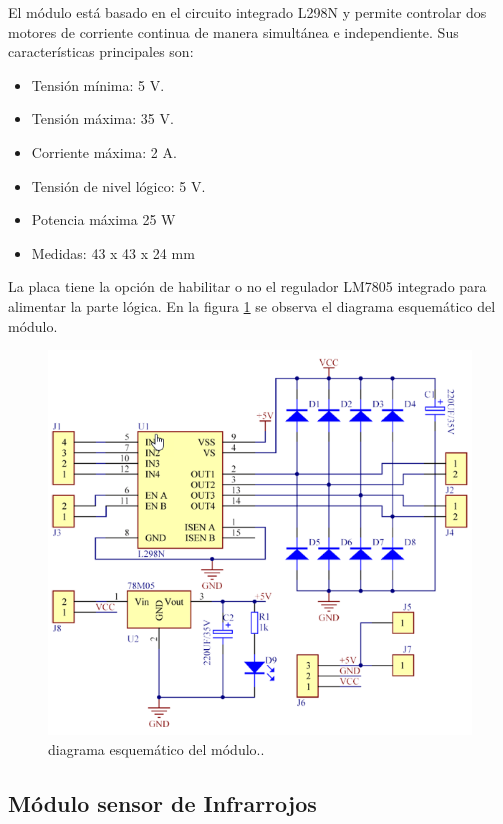 El módulo está basado en el circuito integrado L298N \citep{L298} y permite controlar dos motores de corriente continua de manera simultánea e independiente.  Sus características principales son:

\begin{itemize}
	\item Tensión mínima: 5 V.
	\item Tensión máxima: 35 V.
	\item Corriente máxima: 2 A.
	\item Tensión de nivel lógico: 5 V.
	\item Potencia máxima 25 W
	\item Medidas: 43 x 43 x 24 mm
\end{itemize}

La placa tiene la opción de habilitar o no el regulador LM7805 integrado para alimentar la parte lógica. En la figura \ref{fig:Esquema} se observa el diagrama esquemático del módulo.


\begin{figure}[h]
	\centering
	\includegraphics[width=12cm]{./Figures/Modulo.png}
	\caption{diagrama esquemático del módulo.\protect\footnotemark.}
	\label{fig:Esquema}
\end{figure}
\pagebreak



\subsection{Módulo sensor de Infrarrojos}

